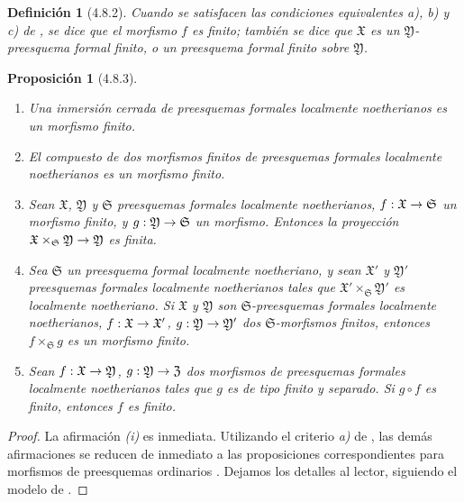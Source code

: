 \documentclass[10pt,oneside,openany]{book}
\theoremstyle{egaenv}\newtheorem*{env}{---}
\theoremstyle{egastatement}
\newtheorem*{proposition}{Proposición}
\theoremstyle{egadescription}
\newtheorem*{definition}{Definición}
\renewcommand{\to}{\mathchoice{\longrightarrow}{\rightarrow}{\rightarrow}{\rightarrow}}
\begin{document}
\begin{definition}[4.8.2]
\label{III.4.8.2}
\label{III.4.8.2-fr}
Cuando se satisfacen las condiciones equivalentes \textup{a)}, \textup{b)} y \textup{c)}
de , se dice que el morfismo $f$ es
finito; también se dice que $\mathfrak X$ es un
$\mathfrak Y$-preesquema formal finito, o un preesquema
formal finito sobre $\mathfrak Y$.
\end{definition}

\begin{proposition}[4.8.3]
\label{III.4.8.3}
\label{III.4.8.3-fr}
\begin{enumerate}
  \item[\rm{(i)}] Una inmersión cerrada de preesquemas formales localmente
    noetherianos es un morfismo finito.
  \item[\rm{(ii)}] El compuesto de dos morfismos finitos de preesquemas formales
    localmente noetherianos es un morfismo finito.
  \item[\rm{(iii)}] Sean $\mathfrak X$, $\mathfrak Y$ y
    $\mathfrak S$ preesquemas formales localmente noetherianos,
    $f:\mathfrak X\to\mathfrak S$ un morfismo finito, y
    $g:\mathfrak Y\to\mathfrak S$ un morfismo. Entonces la proyección
    $\mathfrak X\times_{\mathfrak S}\mathfrak Y\to\mathfrak Y$
    es finita.
  \item[\rm{(iv)}] Sea $\mathfrak S$ un preesquema formal localmente
    noetheriano, y sean $\mathfrak X'$ y $\mathfrak Y'$
    preesquemas formales localmente noetherianos tales que
    $\mathfrak X'\times_{\mathfrak S}\mathfrak Y'$ es localmente
    noetheriano. Si $\mathfrak X$ y $\mathfrak Y$ son
    $\mathfrak S$-preesquemas formales localmente noetherianos,
  $f:\mathfrak X\to\mathfrak X'$, $g:\mathfrak Y\to\mathfrak Y'$ dos
  $\mathfrak S$-morfismos finitos, entonces
    $f\times_{\mathfrak S}g$ es un
  morfismo finito.
\item[\textup{(v)}] Sean $f:\mathfrak X\to\mathfrak Y$,
  $g:\mathfrak Y\to\mathfrak Z$ dos morfismos de preesquemas formales
  localmente noetherianos tales que $g$ es de tipo finito y separado. Si $g\circ f$ es finito,
    entonces $f$ es finito.
\end{enumerate}
\end{proposition}

\begin{proof}
La afirmación \emph{(i)} es inmediata. Utilizando el criterio \emph{a)} de
, las demás afirmaciones se reducen de inmediato a las
proposiciones correspondientes para morfismos de preesquemas ordinarios
. Dejamos los detalles al lector, siguiendo
el modelo de .
\end{proof}
\end{document}
